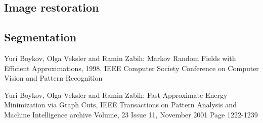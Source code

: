 \documentclass{scrartcl}[12pt, halfparskip]
\begin{document}
\subsection{Image restoration}
\subsection{Segmentation}




\begin{thebibliography}{9}

  Yuri Boykov, Olga Veksler and Ramin Zabih:
  Markov Random Fields with Efficient Approximations,
  1998,
  IEEE Computer Society Conference on Computer Vision and
  Pattern Recognition
  
  Yuri Boykov, Olga Veksler and Ramin Zabih:
  Fast Approximate Energy Minimization via Graph
  Cuts,
  IEEE Transactions on Pattern Analysis and Machine Intelligence archive Volume,
  23 Issue 11, November 2001 Page 1222-1239
  

  

\end{thebibliography}
\end{document}
